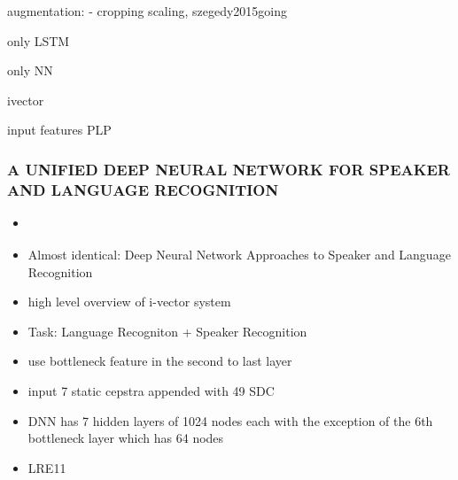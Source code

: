 augmentation:
- cropping scaling, {szegedy2015going}

only LSTM \cite{gonzalez2014automatic, graves2013speech}

only NN \cite{gonzalez2014automatic, han2013trap}

ivector
\cite{dehak2011language}

input features PLP \cite{gonzalez2014automatic}

    \subsubsection{A UNIFIED DEEP NEURAL NETWORK FOR SPEAKER AND LANGUAGE RECOGNITION}
    \begin{itemize}
        \item \cite{richardson2015unified}
        \item Almost identical: Deep Neural Network Approaches to Speaker and Language Recognition \cite{richardson2015deep}
        \item high level overview of i-vector system
        \item Task: Language Recogniton + Speaker Recognition
        \item use bottleneck feature in the second to last layer
        \item input 7 static cepstra appended with 49 SDC
        \item DNN has 7 hidden layers of 1024 nodes each with the exception of the 6th bottleneck layer which has 64 nodes
        \item LRE11
    \end{itemize}
    
